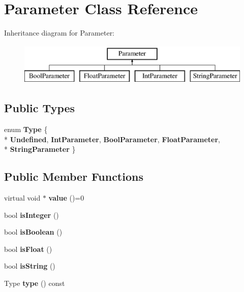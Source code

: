 \hypertarget{classParameter}{\section{Parameter Class Reference}
\label{classParameter}
}
Inheritance diagram for Parameter\-:\begin{figure}[H]
\begin{center}
\leavevmode
\includegraphics[height=2.000000cm]{classParameter}
\end{center}
\end{figure}
\subsection*{Public Types}
\begin{DoxyCompactItemize}
\item 
enum {\bfseries Type} \{ \\*
{\bfseries Undefined}, 
{\bfseries Int\-Parameter}, 
{\bfseries Bool\-Parameter}, 
{\bfseries Float\-Parameter}, 
\\*
{\bfseries String\-Parameter}
 \}
\end{DoxyCompactItemize}
\subsection*{Public Member Functions}
\begin{DoxyCompactItemize}
\item 
\hypertarget{classParameter_a7c153c936909b52f3fdbf2ba3b328dcb}{virtual void $\ast$ {\bfseries value} ()=0}\label{classParameter_a7c153c936909b52f3fdbf2ba3b328dcb}

\item 
\hypertarget{classParameter_ae70ff10b9fa2ab2458286c411a2cb5be}{bool {\bfseries is\-Integer} ()}\label{classParameter_ae70ff10b9fa2ab2458286c411a2cb5be}

\item 
\hypertarget{classParameter_a0c25100815bda4ae19801fc146529535}{bool {\bfseries is\-Boolean} ()}\label{classParameter_a0c25100815bda4ae19801fc146529535}

\item 
\hypertarget{classParameter_a98c8b305c1e1be9a02240233dac083d9}{bool {\bfseries is\-Float} ()}\label{classParameter_a98c8b305c1e1be9a02240233dac083d9}

\item 
\hypertarget{classParameter_a005bd9dc4f0520cfec7d4a87d7613287}{bool {\bfseries is\-String} ()}\label{classParameter_a005bd9dc4f0520cfec7d4a87d7613287}

\item 
\hypertarget{classParameter_af5a165fc9bcfa0d9b2abd0777cb433bd}{Type {\bfseries type} () const }\label{classParameter_af5a165fc9bcfa0d9b2abd0777cb433bd}

\end{DoxyCompactItemize}
